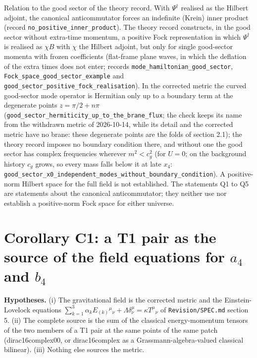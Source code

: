 \documentclass[11pt]{article}
\begin{document}
Relation to the good sector of the theory record. With $\Psi^\dagger$ realised as the Hilbert adjoint, the canonical anticommutator forces an indefinite (Krein) inner product (record \texttt{no\_posit\allowbreak{}ive\_inne\allowbreak{}r\_produc\allowbreak{}t}). The theory record constructs, in the good sector without extra-time momentum, a positive Fock representation in which $\Psi^\dagger$ is realised as $\chi B$ with $\chi$ the Hilbert adjoint, but only for single good-sector momenta with frozen coefficients (flat-frame plane waves, in which the deflation of the extra times does not enter; records \texttt{mode\_ham\allowbreak{}iltonian\allowbreak{}\_good\_se\allowbreak{}ctor}, \texttt{Fock\_spa\allowbreak{}ce\_good\_\allowbreak{}sector\_e\allowbreak{}xample} and \texttt{good\_sec\allowbreak{}tor\_posi\allowbreak{}tive\_foc\allowbreak{}k\_realis\allowbreak{}ation}). In the corrected metric the curved good-sector mode operator is Hermitian only up to a boundary term at the degenerate points $z = \pi/2 + n\pi$ (\texttt{good\_sec\allowbreak{}tor\_herm\allowbreak{}iticity\_\allowbreak{}up\_to\_th\allowbreak{}e\_brane\_\allowbreak{}flux}; the check keeps its name from the withdrawn metric of 2026-10-14, while its detail and the corrected metric have no brane: these degenerate points are the folds of section 2.1); the theory record imposes no boundary condition there, and without one the good sector has complex frequencies wherever $m^2 < c_g^2$ (for $U = 0$; on the background history $c_g$ grows, so every mass falls below it at late $x_4$: \texttt{good\_sec\allowbreak{}tor\_x0\_i\allowbreak{}ndepende\allowbreak{}nt\_modes\allowbreak{}\_without\allowbreak{}\_boundar\allowbreak{}y\_condit\allowbreak{}ion}). A positive-norm Hilbert space for the full field is not established. The statements Q1 to Q5 are statements about the canonical anticommutator; they neither use nor establish a positive-norm Fock space for either universe.

\section{Corollary C1: a T1 pair as the source of the field equations for \texorpdfstring{$a_4$}{a\_4} and \texorpdfstring{$b_4$}{b\_4}}

\textbf{Hypotheses.} (i) The gravitational field is the corrected metric and the Einstein-Lovelock equations $\sum_{k=1}^3\alpha_kE_{(k)}{}^\mu{}_\nu + \Lambda\delta^\mu_\nu = \kappa T^\mu{}_\nu$ of \texttt{Revision\allowbreak{}/SPEC.md} section 5. (ii) The complete source is the sum of the classical energy-momentum tensors of the two members of a T1 pair at the same points of the same patch (dirac16complex00, or dirac16complex as a Grassmann-algebra-valued classical bilinear). (iii) Nothing else sources the metric.
\end{document}
